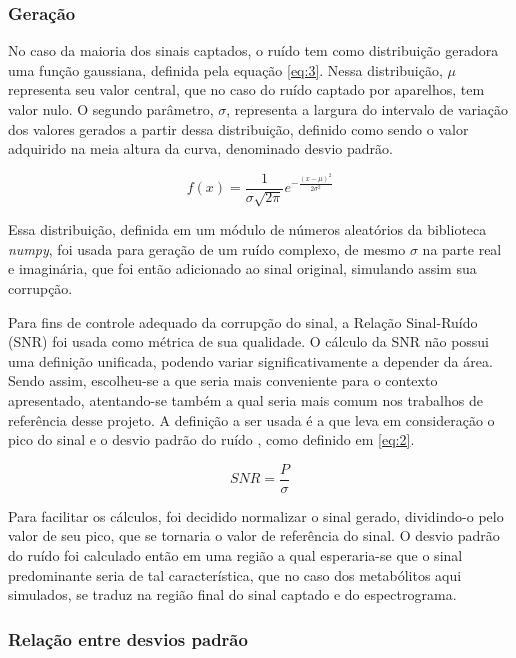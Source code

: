 \documentclass{article}
\begin{document}
\subsubsection{Geração}

No caso da maioria dos sinais captados, o ruído tem como distribuição geradora uma função gaussiana, definida pela equação \ref{eq:3}. Nessa distribuição, $\mu$ representa seu valor central, 
que no caso do ruído captado por aparelhos, tem valor nulo. O segundo parâmetro, $\sigma$, representa a largura do intervalo de variação dos valores gerados a partir dessa 
distribuição, definido como sendo o valor adquirido na meia altura da curva, denominado desvio padrão.


\begin{equation} \label{eq:3}
    f(x) = \frac{1}{\sigma \sqrt{2\pi}}e^{-\frac{(x - \mu)^2}{2\sigma ^2}}
\end{equation}

Essa distribuição, definida em um módulo de números aleatórios da biblioteca \textit{numpy}, foi usada para geração de um ruído complexo, de mesmo $\sigma$ na parte real e imaginária, que foi então adicionado ao sinal original, simulando assim sua
corrupção.

Para fins de controle adequado da corrupção do sinal, a Relação Sinal-Ruído (SNR) foi usada como métrica de sua qualidade. O cálculo da SNR não possui uma definição unificada, podendo variar significativamente a depender da área. Sendo assim, 
escolheu-se a que seria mais conveniente para o contexto apresentado, atentando-se também a qual seria mais comum nos trabalhos de referência desse projeto. A definição a ser usada é a que 
leva em consideração o pico do sinal e o desvio padrão do ruído \cite{}, como definido em \ref{eq:2}.  

\begin{equation} \label{eq:2}
    SNR = \frac{P}{\sigma}
\end{equation}

Para facilitar os cálculos, foi decidido normalizar o sinal gerado, dividindo-o pelo valor de seu pico, que se tornaria o valor de referência do sinal. O desvio padrão do ruído foi 
calculado então em uma região a qual esperaria-se que o sinal predominante seria de tal característica, que no caso dos metabólitos aqui simulados, se traduz na região final do sinal captado e do espectrograma.

\subsubsection{Relação entre desvios padrão}
\end{document}
